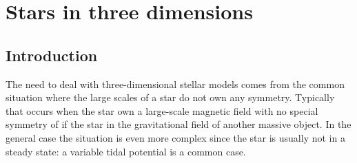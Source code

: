 \chapter{Stars in three dimensions}
\label{chap:3D}


\section{Introduction}

The need to deal with three-dimensional stellar models comes from the common
situation where the large scales of a star do not own any symmetry. Typically
that occurs when the star own a large-scale magnetic field with no special
symmetry of if the star  in the gravitational field of another massive object.
In the general case the situation is even more complex since the star is
usually not in a steady state: a variable tidal potential is a common case.

